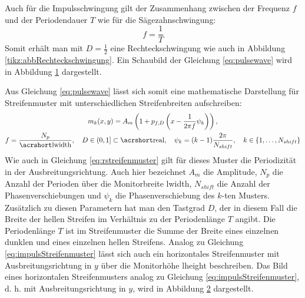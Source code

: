 Auch für die Impulsschwingung gilt der Zusammenhang zwischen der Frequenz $f$ und der Periodendauer $T$ wie für die Sä\-ge\-zahn\-schwin\-gung:
%
\begin{equation*}
	f = \dfrac{1}{T}
\end{equation*}
%
Somit erhält man mit $D = \tfrac{1}{2}$ eine Rechteckschwingung wie auch in Abbildung \ref{tikz:abbRechteckschwingung}.
Ein Schaubild der Gleichung \ref{eq:pulsewave} wird in Abbildung \ref{tikz:abbNormalPulsewave} dargestellt.
%
{
	\begin{figure}[H]
		\centering
		
		\label{tikz:abbNormalPulsewave}
	\end{figure}
}
%
\noindent
Aus Gleichung \ref{eq:pulsewave} lässt sich somit eine mathematische Darstellung für Streifenmuster mit unterschiedlichen Streifenbreiten aufschreiben:
%
\begin{equation} \label{eq:impulsStreifenmuster}
	\begin{gathered}
		m_k(x,y) = A_m \left( 1 + p_{f,D}\left( x - \dfrac{1}{2 \pi f} \psi_k \right) \right),
		\\
		f = \dfrac{N_p}{\acrshortmath{lwidth}},
		\quad
		D \in \left(0,1\right] \subset \acrshortmath{real},
		\quad
		\psi_k = (k - 1)\dfrac{2\pi}{N_{shift}},
		\quad
		k \in \lbrace 1,\ldots,N_{shift}\rbrace
	\end{gathered}
\end{equation}
%
Wie auch in Gleichung \ref{eq:rstreifenmuster} gilt für dieses Muster die Periodizität in der Ausbreitungsrichtung.
Auch hier bezeichnet $A_m$ die Amplitude, $N_p$ die Anzahl der Perioden über die Monitorbreite \acrshort{lwidth}, $N_{shift}$ die Anzahl der Phasenverschiebungen und $\psi_k$ die Phasenverschiebung des $k$-ten Musters.
Zusätzlich zu diesen Parametern hat man den Tastgrad $D$, der in diesem Fall die Breite der hellen Streifen im Verhältnis zu der Periodenlänge $T$ angibt.
Die Periodenlänge $T$ ist im Streifenmuster die Summe der Breite eines einzelnen dunklen und eines einzelnen hellen Streifens.
Analog zu Gleichung \ref{eq:impulsStreifenmuster} lässt sich auch ein horizontales Streifenmuster mit Ausbreitungsrichtung in $y$ über die Monitorhöhe \acrshort{lheight} beschreiben.
Das Bild eines horizontalen Streifenmusters analog zu Gleichung \ref{eq:impulsStreifenmuster}, d. h. mit Ausbreitungsrichtung in $y$, wird in Abbildung \ref{tikz:abbImpulsStreifenmuster} dargestellt.
%
{
	\begin{figure}[H]
		\centering
		
		\label{tikz:abbImpulsStreifenmuster}
	\end{figure}
}
